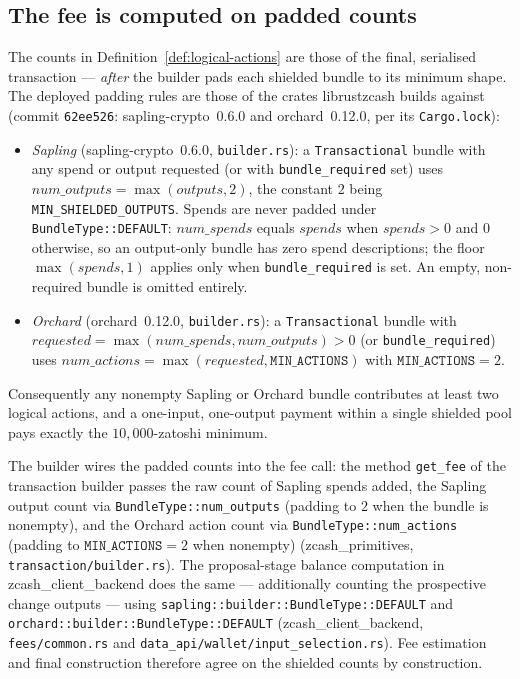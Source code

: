 \documentclass[11pt,a4paper]{article}
\theoremstyle{definition}
\begin{document}
\subsection{The fee is computed on padded counts}\label{sec:fees-padding}

The counts in Definition~\ref{def:logical-actions} are those of the final,
serialised transaction --- \emph{after} the builder pads each shielded
bundle to its minimum shape. The deployed padding rules are those of the
crates \textsf{librustzcash} builds against (commit \texttt{62ee526}:
\textsf{sapling-crypto}~0.6.0 and \textsf{orchard}~0.12.0, per its
\texttt{Cargo.lock}):
\begin{itemize}[leftmargin=*]
\item \emph{Sapling} (\textsf{sapling-crypto}~0.6.0, \texttt{builder.rs}):
a \texttt{Transactional} bundle with any spend or output requested (or with
\texttt{bundle\_required} set) uses
$\mathit{num\_outputs} = \max(\mathit{outputs}, 2)$, the constant $2$
being \texttt{MIN\_SHIELDED\_OUTPUTS}. Spends are never padded under
\texttt{BundleType::DEFAULT}: $\mathit{num\_spends}$ equals
$\mathit{spends}$ when $\mathit{spends} > 0$ and $0$ otherwise, so an
output-only bundle has zero spend descriptions; the floor
$\max(\mathit{spends}, 1)$ applies only when \texttt{bundle\_required} is
set. An empty, non-required bundle is omitted entirely.
\item \emph{Orchard} (\textsf{orchard}~0.12.0, \texttt{builder.rs}): a
\texttt{Transactional} bundle with
$\mathit{requested} = \max(\mathit{num\_spends}, \mathit{num\_outputs}) > 0$
(or \texttt{bundle\_required}) uses
$\mathit{num\_actions} = \max(\mathit{requested}, \texttt{MIN\_ACTIONS})$
with $\texttt{MIN\_ACTIONS} = 2$.
\end{itemize}
Consequently any nonempty Sapling or Orchard bundle contributes at least
two logical actions, and a one-input, one-output payment within a single
shielded pool pays exactly the $10{,}000$-zatoshi minimum.

The builder wires the padded counts into the fee call: the method
\texttt{get\_fee} of the transaction builder passes the raw count of
Sapling spends added, the Sapling output count via
\texttt{BundleType::num\_outputs} (padding to $2$ when the bundle is
nonempty), and the Orchard action count via
\texttt{BundleType::num\_actions} (padding to $\texttt{MIN\_ACTIONS} = 2$
when nonempty) (\textsf{zcash\_primitives},
\texttt{transaction/builder.rs}). The proposal-stage balance computation in
\textsf{zcash\_client\_backend} does the same --- additionally counting the
prospective change outputs --- using
\texttt{sapling::builder::BundleType::DEFAULT} and
\texttt{orchard::builder::BundleType::DEFAULT}
(\textsf{zcash\_client\_backend}, \texttt{fees/common.rs} and
\texttt{data\_api/wallet/input\_selection.rs}). Fee estimation and final
construction therefore agree on the shielded counts by construction.
\end{document}
